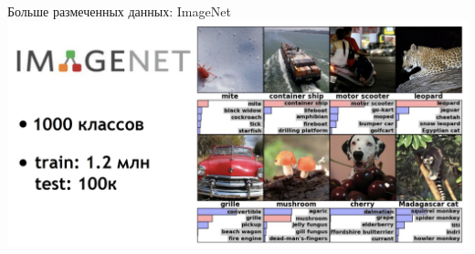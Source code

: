 \documentclass[aspectratio=169, professionalfonts]{beamer}
\begin{document}
\begin{frame}{Больше размеченных данных: ImageNet}
    \centering
    \includegraphics[width=.97\linewidth]{figures/fig50-imagenet-overview.jpg}
\end{frame}
\end{document}

